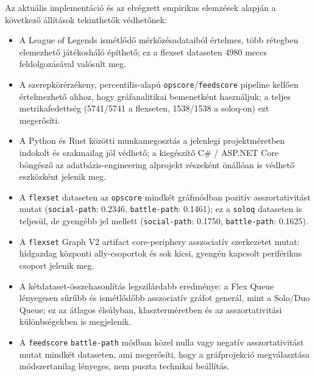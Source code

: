 Az aktuális implementáció és az elvégzett empirikus elemzések alapján a következő állítások tekinthetők védhetőnek:

\begin{itemize}
    \item A League of Legends ismétlődő mérkőzésadataiból értelmes, több rétegben elemezhető játékosháló építhető; ez a flexset dataseten 4980 meccs feldolgozásával valósult meg.
    \item A szerepkörérzékeny, percentilis-alapú \texttt{opscore}/\texttt{feedscore} pipeline kellően értelmezhető ahhoz, hogy gráfanalitikai bemenetként használjuk; a teljes metrikafedettség (5741/5741 a flexseten, 1538/1538 a soloq-on) ezt megerősíti.
    \item A Python és Rust közötti munkamegosztás a jelenlegi projektméretben indokolt és szakmailag jól védhető; a kiegészítő C\# / ASP.NET Core böngésző az adatbázis-engineering alprojekt részeként önállóan is védhető eszközként jelenik meg.
    \item A \texttt{flexset} dataseten az \texttt{opscore} mindkét gráfmódban pozitív asszortativitást mutat (\texttt{social-path}: 0.2346, \texttt{battle-path}: 0.1461); ez a \texttt{soloq} dataseten is teljesül, de gyengébb jel mellett (\texttt{social-path}: 0.1750, \texttt{battle-path}: 0.1625).
    \item A \texttt{flexset} Graph V2 artifact core-periphery asszociatív szerkezetet mutat: hídgazdag központi ally-csoportok és sok kicsi, gyengén kapcsolt periférikus csoport jelenik meg.
    \item A kétdataset-összehasonlítás legszilárdabb eredménye: a Flex Queue lényegesen sűrűbb és ismétlődőbb asszociatív gráfot generál, mint a Solo/Duo Queue; ez az átlagos élsúlyban, klaszterméretben és az asszortativitási különbségekben is megjelenik.
    \item A \texttt{feedscore} \texttt{battle-path} módban közel nulla vagy negatív asszortativitást mutat mindkét dataseten, ami megerősíti, hogy a gráfprojekció megválasztása módszertanilag lényeges, nem puszta technikai beállítás.
\end{itemize}
